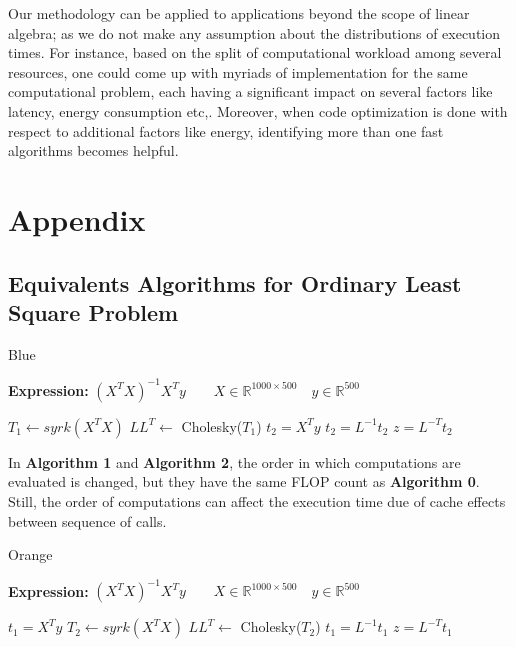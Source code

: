 \documentclass[conference]{IEEEtran}
\begin{document}
Our methodology can be applied to applications beyond the scope of linear algebra; as we do not make any assumption about the distributions of execution times.  For instance, based on the split of computational workload among several resources, one could come up with myriads of implementation for the same computational problem, each having a significant impact on several factors like latency, energy consumption etc,\cite{clonecloud}. Moreover, when code optimization is done with respect to additional factors like energy, identifying more than one fast algorithms becomes helpful. 




\section*{Appendix}
\subsection{Equivalents Algorithms for Ordinary Least Square Problem}
\label{sec:appA}
\begin{algorithm}
	\renewcommand{\thealgorithm}{}
	\caption{ Blue }
	\label{alg:a0}
	\textbf{Expression: } $(X^TX)^{-1}X^{T}y \qquad X \in \mathbb{R}^{1000 \times 500} \quad y \in \mathbb{R}^{500}$ 
	\begin{algorithmic}[1] 
		\State $T_1 \leftarrow syrk(X^{T}X)$ 
		\State $LL^{T} \leftarrow $ Cholesky($T_1$) 
		\State $t_2 = X^{T}y$ 
		\State $t_2 = L^{-1}t_2$ 
		\State $z = L^{-T}t_2$
	\end{algorithmic}
\end{algorithm}

In \textbf{Algorithm 1} and \textbf{Algorithm 2}, the order in which computations are evaluated is changed, but they have the same FLOP count  as \textbf{Algorithm 0}. Still, the order of computations can affect the execution time due of cache effects between sequence of calls\cite{peise2014cache}.
\begin{algorithm}
	\renewcommand{\thealgorithm}{}
	\caption{ Orange }
	\label{alg:a0}
	\textbf{Expression: } $(X^TX)^{-1}X^{T}y \qquad X \in \mathbb{R}^{1000 \times 500} \quad y \in \mathbb{R}^{500}$ 
	\begin{algorithmic}[1] 
		\State $t_1 = X^{T}y$ 
		\State $T_2 \leftarrow syrk(X^{T}X)$ 
		\State $LL^{T} \leftarrow $ Cholesky($T_2$) 
		\State $t_1 = L^{-1}t_1$ 
		\State $z = L^{-T}t_1$
	\end{algorithmic}
\end{algorithm}
\end{document}
